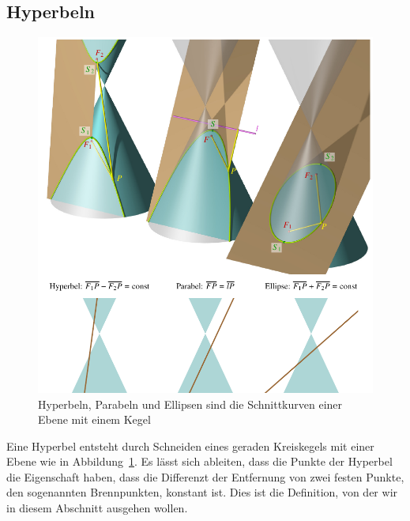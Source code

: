 \subsection{Hyperbeln
\label{buch:geometrie:subsection:hyperbeln}}
\begin{figure}
\centering
\includegraphics{chapters/030-geometrie/images/kegelschnitte.pdf}
\caption{Hyperbeln, Parabeln und Ellipsen sind die Schnittkurven einer
Ebene mit einem Kegel
\label{buch:geometrie:laenge:fig:kegelschnitte}}
\end{figure}
Eine Hyperbel entsteht durch Schneiden eines geraden Kreiskegels mit
einer Ebene wie in Abbildung~\ref{buch:geometrie:laenge:fig:kegelschnitte}.
Es lässt sich ableiten, dass die Punkte der Hyperbel die Eigenschaft
haben, dass die Differenzt der Entfernung von zwei festen Punkte,
den sogenannten Brennpunkten, konstant ist.
Dies ist die Definition, von der wir in diesem Abschnitt ausgehen
wollen.

